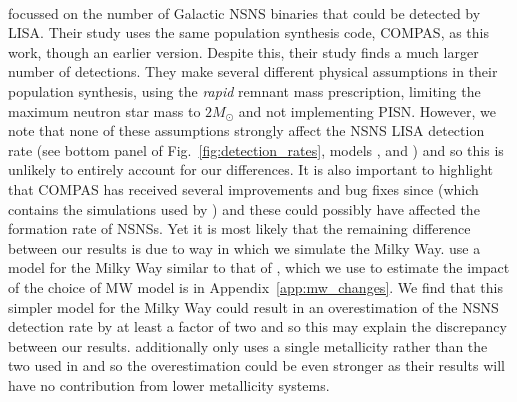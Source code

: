 \paragraph{\citet{Lau+2020}} focussed on the number of Galactic NSNS binaries that could be detected by LISA. Their study uses the same population synthesis code, COMPAS, as this work, though an earlier version. Despite this, their study finds a much larger number of detections. They make several different physical assumptions in their population synthesis, using the \citet{Fryer+2012} \textit{rapid} remnant mass prescription, limiting the maximum neutron star mass to $2 \unit{M_{\odot}}$ and not implementing PISN. However, we note that none of these assumptions strongly affect the NSNS LISA detection rate (see bottom panel of Fig.~\ref{fig:detection_rates}, models \modRapid{}, \modNSLow{} and \modNoPISN{}) and so this is unlikely to entirely account for our differences. It is also important to highlight that COMPAS has received several improvements and bug fixes since \citet{Vigna-Gomez+2018} (which contains the simulations used by \citet{Lau+2020}) and these could possibly have affected the formation rate of NSNSs.
%
Yet it is most likely that the remaining difference between our results is due to way in which we simulate the Milky Way. \citet{Lau+2020} use a model for the Milky Way similar to that of \citet{Breivik+2020}, which we use to estimate the impact of the choice of MW model is in Appendix~\ref{app:mw_changes}. We find that this simpler model for the Milky Way could result in an overestimation of the NSNS detection rate by at least a factor of two and so this may explain the discrepancy between our results. \citet{Lau+2020} additionally only uses a single metallicity rather than the two used in \citet{Breivik+2020} and so the overestimation could be even stronger as their results will have no contribution from lower metallicity systems.

